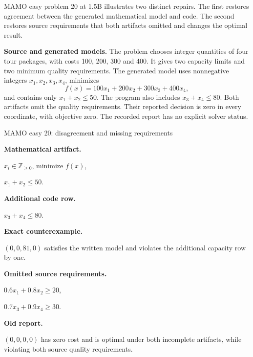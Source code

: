 MAMO easy problem 20 at 1.5B illustrates two distinct repairs. The first restores agreement between
the generated mathematical model and code. The second restores source requirements that both
artifacts omitted and changes the optimal result.

\textbf{Source and generated models.} The problem chooses integer quantities of four tour
packages, with costs 100, 200, 300 and 400. It gives two capacity limits and two minimum quality
requirements. The generated model uses nonnegative integers \(x_1,x_2,x_3,x_4\), minimizes
\begin{equation}
f(x)=100x_1+200x_2+300x_3+400x_4,
\label{eq:mamocost}
\end{equation}
and contains only \(x_1+x_2\leq50\). The program also includes \(x_3+x_4\leq80\).
Both artifacts omit the quality requirements. Their reported decision is zero in every coordinate,
with objective zero. The recorded report has no explicit solver status.

\begin{evidencecase}{MAMO easy 20: disagreement and missing requirements}
\begin{minipage}[t]{0.475\linewidth}\vspace{0pt}\small
\textcolor{verdictblue}{\textbf{Mathematical artifact.}}\par
\(x_i\in\mathbb Z_{\geq0}\), minimize \(f(x)\),\par
\(x_1+x_2\leq50\).\par\medskip
\textcolor{verdictorange}{\textbf{Additional code row.}}\par
\(x_3+x_4\leq80\).\par\medskip
\textcolor{verdictorange}{\textbf{Exact counterexample.}}\par
\((0,0,81,0)\) satisfies the written model and violates the additional capacity row by one.
\end{minipage}\hfill
\begin{minipage}[t]{0.475\linewidth}\vspace{0pt}\small
\textcolor{verdictblue}{\textbf{Omitted source requirements.}}\par
\(0.6x_1+0.8x_2\geq20\),\par
\(0.7x_3+0.9x_4\geq30\).\par\medskip
\textcolor{verdictorange}{\textbf{Old report.}}\par
\((0,0,0,0)\) has zero cost and is optimal under both incomplete artifacts, while violating both
source quality requirements.
\end{minipage}
\end{evidencecase}

